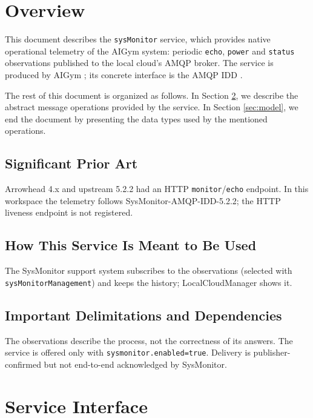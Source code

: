 \documentclass[a4paper]{arrowhead}
\begin{document}
\section{Overview}
\label{sec:overview}

This document describes the \texttt{sysMonitor} service, which provides native operational telemetry of the AIGym system: periodic \texttt{echo}, \texttt{power} and \texttt{status} observations published to the local cloud's AMQP broker.
The service is produced by AIGym \cite{aig-sysd}; its concrete interface is the AMQP IDD \cite{aig-sysMonitor-amqp-idd}.

The rest of this document is organized as follows.
In Section \ref{sec:operations}, we describe the abstract message operations provided by the service.
In Section \ref{sec:model}, we end the document by presenting the data types used by the mentioned operations.

\subsection{Significant Prior Art}

Arrowhead 4.x and upstream 5.2.2 had an HTTP \texttt{monitor}/\texttt{echo} endpoint. In this workspace the telemetry follows SysMonitor-AMQP-IDD-5.2.2; the HTTP liveness endpoint is not registered.

\subsection{How This Service Is Meant to Be Used}

The SysMonitor support system subscribes to the observations (selected with \texttt{sys\allowbreak{}Monitor\allowbreak{}Management}) and keeps the history; LocalCloudManager shows it.

\subsection{Important Delimitations and Dependencies}
\label{sec:delimitations}

The observations describe the process, not the correctness of its answers. The service is offered only with \texttt{sysmonitor.\allowbreak{}enabled=\allowbreak{}true}. Delivery is publisher-confirmed but not end-to-end acknowledged by SysMonitor.

\newpage

\section{Service Interface}
\label{sec:operations}
\end{document}
